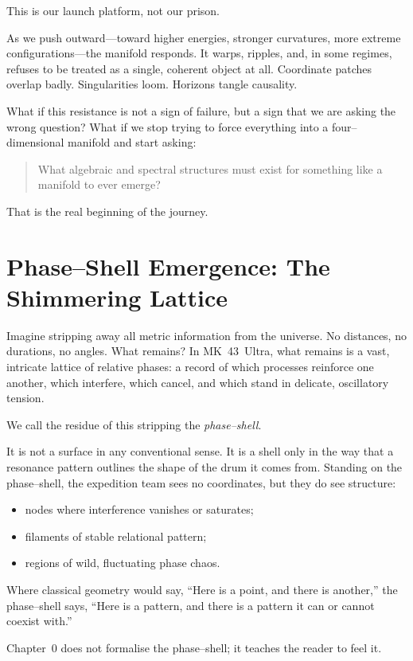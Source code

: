 This is our launch platform, not our prison.

As we push outward—toward higher energies, stronger curvatures, more extreme configurations—the
manifold responds. It warps, ripples, and, in some regimes, refuses to be treated as a single,
coherent object at all. Coordinate patches overlap badly. Singularities loom. Horizons tangle
causality.

What if this resistance is not a sign of failure, but a sign that we are asking the wrong
question? What if we stop trying to force everything into a four–dimensional manifold and start
asking:

\begin{quote}
What algebraic and spectral structures must exist for something like a manifold to ever emerge?
\end{quote}

That is the real beginning of the journey.

\section{Phase–Shell Emergence: The Shimmering Lattice}
Imagine stripping away all metric information from the universe. No distances, no durations, no
angles. What remains? In MK~43~Ultra, what remains is a vast, intricate lattice of relative
phases: a record of which processes reinforce one another, which interfere, which cancel, and
which stand in delicate, oscillatory tension.

We call the residue of this stripping the \emph{phase–shell}.

It is not a surface in any conventional sense. It is a shell only in the way that a resonance
pattern outlines the shape of the drum it comes from. Standing on the phase–shell, the expedition
team sees no coordinates, but they do see structure:
\begin{itemize}
  \item nodes where interference vanishes or saturates;
  \item filaments of stable relational pattern;
  \item regions of wild, fluctuating phase chaos.
\end{itemize}

Where classical geometry would say, ``Here is a point, and there is another,'' the phase–shell
says, ``Here is a pattern, and there is a pattern it can or cannot coexist with.''

Chapter~0 does not formalise the phase–shell; it teaches the reader to feel it.

